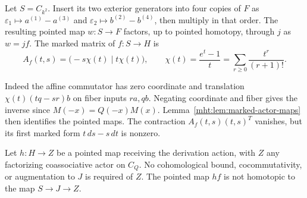Let $S=C_{k^2}$. Insert its two exterior generators
into four copies of $F$ as
$\varepsilon_1\mapsto a^{(1)}-a^{(3)}$ and
$\varepsilon_2\mapsto b^{(2)}-b^{(4)}$, then multiply
in that order. The resulting pointed map $w:S\to F$
factors, up to pointed homotopy, through $j$ as
$w=jf$. The marked matrix of $f:S\to H$ is
\begin{equation}\label{mht:eq:actor-marked-commutator}
 A_f(t,s)=\bigl(-s\chi(t)\mid t\chi(t)\bigr),
 \qquad \chi(t)=\frac{e^t-1}{t}
                 =\sum_{r\geq0}\frac{t^r}{(r+1)!}.
\end{equation}

Indeed the affine commutator has zero coordinate
and translation $\chi(t)(tq-sr)b$ on fiber inputs
$ra,qb$. Negating coordinate and fiber gives the
inverse since $M(-x)=Q(-x)M(x)$. Lemma~\ref{mht:lem:marked-actor-maps}
then identifies the pointed maps. The contraction
$A_f(t,s)(t,s)^T$ vanishes, but its first marked
form $t\,ds-s\,dt$ is nonzero.

\begin{lemma}\label{mht:lem:geometric-actor-detector}
Let $h:H\to Z$ be a pointed map receiving the
derivation action, with $Z$ any factorizing
coassociative actor on $C_Q$. No cohomological bound,
cocommutativity, or augmentation to $J$ is required
of $Z$. The pointed map $hf$ is not homotopic to
the map $S\to J\to Z$.
\end{lemma}

